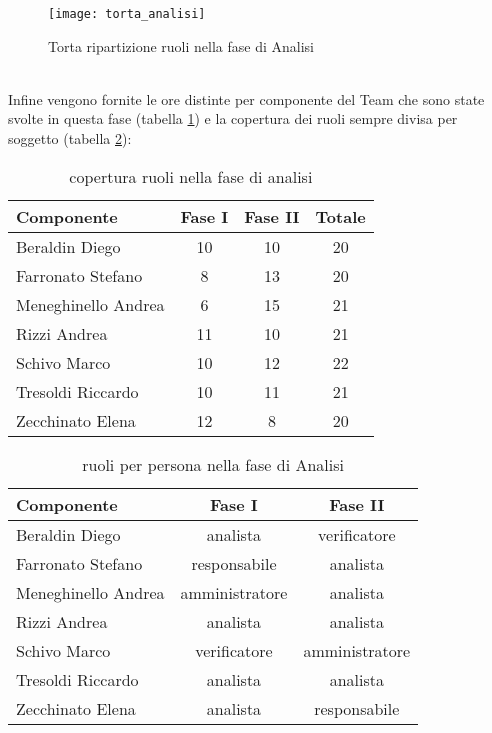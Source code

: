 \begin{figure}[h!]
\centering
  \texttt{[image: torta\_analisi]}
\caption{Torta ripartizione ruoli nella fase di Analisi}\label{fig:ruolian}
\end{figure}\\
\clearpage
Infine vengono fornite le ore distinte per componente del Team che sono state svolte in questa fase (tabella \ref{tab:ruolian2}) e la copertura dei ruoli sempre divisa per soggetto (tabella \ref{tab:ruolian3}):\\
\begin{table}[h!]
\centering
\begin{tabular}{|l|c|c|c|}
\hline
Componente& Fase I& Fase II& Totale\\
\hline
Beraldin Diego &10 &10 & 20\\
Farronato Stefano & 8& 13& 20\\
Meneghinello Andrea & 6& 15& 21\\
Rizzi Andrea & 11& 10& 21\\
Schivo Marco & 10& 12& 22\\
Tresoldi Riccardo & 10& 11& 21\\
Zecchinato Elena & 12& 8& 20\\
\hline
\end{tabular}
\caption{copertura ruoli nella fase di analisi}\label{tab:ruolian2}
\end{table}
\begin{table}[h!]
\centering
\begin{tabular}{|l|c|c|}
\hline
Componente& Fase I&Fase II\\
\hline
Beraldin Diego & analista&verificatore\\
Farronato Stefano & responsabile&analista\\
Meneghinello Andrea & amministratore&analista\\
Rizzi Andrea &  analista&analista\\
Schivo Marco & verificatore&amministratore\\
Tresoldi Riccardo & analista&analista\\
Zecchinato Elena & analista&responsabile\\
\hline
\end{tabular}
\caption{ruoli per persona nella fase di Analisi}\label{tab:ruolian3}
\end{table}


\clearpage
